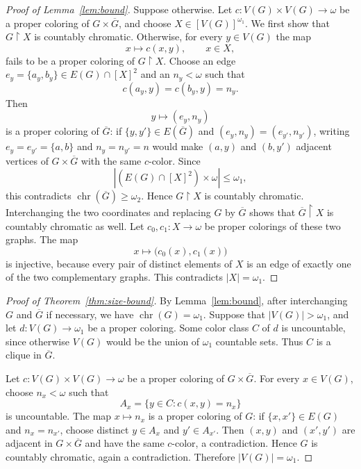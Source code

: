 \documentclass[10pt,a4paper]{amsart}
\numberwithin{equation}{section}
\theoremstyle{definition}
\theoremstyle{remark}
\newcommand{\chr}{\operatorname{chr}}
\newcommand{\restr}{\mathbin{\upharpoonright}}
\begin{document}
\begin{proof}[Proof of Lemma~\ref{lem:bound}]
Suppose otherwise.  Let
$c:V(G)\times V(G)\to\omega$ be a proper coloring of
$G\times\overline G$, and choose $X\in[V(G)]^{\omega_1}$.  We first
show that $G\restr X$ is countably chromatic.  Otherwise, for every
$y\in V(G)$ the map
\begin{displaymath}
 x\longmapsto c(x,y),\qquad x\in X,
\end{displaymath}
fails to be a proper coloring of $G\restr X$.  Choose an edge
$e_y=\{a_y,b_y\}\in E(G)\cap[X]^2$ and an $n_y<\omega$ such that
\begin{displaymath}
 c(a_y,y)=c(b_y,y)=n_y.
\end{displaymath}
Then
\begin{displaymath}
 y\longmapsto(e_y,n_y)
\end{displaymath}
is a proper coloring of $\overline G$: if $\{y,y'\}\in E(\overline G)$
and $(e_y,n_y)=(e_{y'},n_{y'})$, writing
$e_y=e_{y'}=\{a,b\}$ and $n_y=n_{y'}=n$ would make $(a,y)$ and
$(b,y')$ adjacent vertices of $G\times\overline G$ with the same
$c$-color.  Since
\begin{displaymath}
 |(E(G)\cap[X]^2)\times\omega|\leq\omega_1,
\end{displaymath}
this contradicts $\chr(\overline G)\geq\omega_2$.  Hence
$G\restr X$ is countably chromatic.  Interchanging the two coordinates
and replacing $G$ by $\overline G$ shows that
$\overline G\restr X$ is countably chromatic as well.  Let
$c_0,c_1:X\to\omega$ be proper colorings of these two graphs.  The map
\begin{displaymath}
 x\longmapsto\bigl(c_0(x),c_1(x)\bigr)
\end{displaymath}
is injective, because every pair of distinct elements of $X$ is an
edge of exactly one of the two complementary graphs.  This contradicts
$|X|=\omega_1$.
\end{proof}

\begin{proof}[Proof of Theorem~\ref{thm:size-bound}]
By Lemma~\ref{lem:bound}, after interchanging $G$ and $\overline G$
if necessary, we have $\chr(G)=\omega_1$.  Suppose that
$|V(G)|>\omega_1$, and let $d:V(G)\to\omega_1$ be a proper coloring.
Some color class $C$ of $d$ is uncountable, since otherwise $V(G)$
would be the union of $\omega_1$ countable sets.  Thus $C$ is a clique
in $\overline G$.

Let $c:V(G)\times V(G)\to\omega$ be a proper coloring of
$G\times\overline G$.  For every $x\in V(G)$, choose $n_x<\omega$ such
that
\begin{displaymath}
 A_x=\{y\in C:c(x,y)=n_x\}
\end{displaymath}
is uncountable.  The map $x\mapsto n_x$ is a proper coloring of
$G$: if $\{x,x'\}\in E(G)$ and $n_x=n_{x'}$, choose distinct
$y\in A_x$ and $y'\in A_{x'}$.  Then $(x,y)$ and $(x',y')$ are
adjacent in $G\times\overline G$ and have the same $c$-color, a
contradiction.  Hence $G$ is countably chromatic, again a
contradiction.  Therefore $|V(G)|=\omega_1$.
\end{proof}
\end{document}
